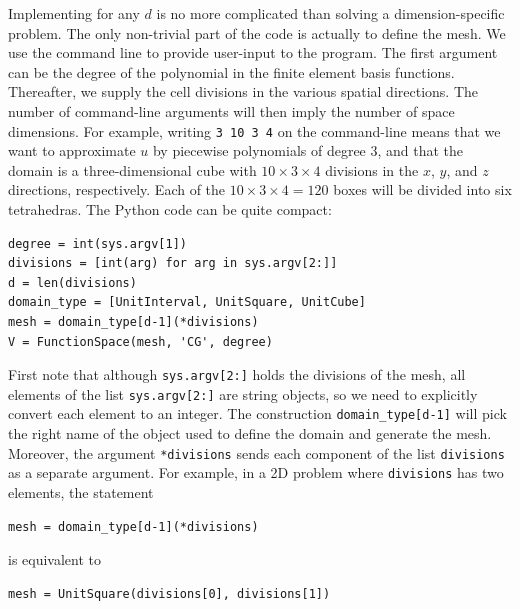 Implementing  for any $d$ is no more
complicated than solving a dimension-specific problem.
The only non-trivial part of the code is actually to define the mesh.
We use the command line to provide user-input to the program. The first argument
can be the degree of the polynomial in the finite element basis functions.
Thereafter, we supply the
cell divisions in the various spatial directions. The number of
command-line arguments will then imply the number of space dimensions.
For example, writing {\fontsize{12pt}{12pt}\texttt{3 10 3 4}} on the command-line means that
we want to approximate $u$ by piecewise polynomials of degree 3,
and that the domain is a three-dimensional cube with $10\times 3\times 4$
divisions in the $x$, $y$, and $z$ directions, respectively.
Each of the $10\times 3\times 4 = 120$ boxes will
be divided into six tetrahedras.
The Python code can be quite compact:
\begin{Verbatim}[fontsize=\fontsize{10pt}{10pt},tabsize=8,baselinestretch=1.05,
fontfamily=tt,xleftmargin=7mm]
degree = int(sys.argv[1])
divisions = [int(arg) for arg in sys.argv[2:]]
d = len(divisions)
domain_type = [UnitInterval, UnitSquare, UnitCube]
mesh = domain_type[d-1](*divisions)
V = FunctionSpace(mesh, 'CG', degree)
\end{Verbatim}
\noindent
First note that although {\fontsize{12pt}{12pt}\texttt{sys.argv[2:]}} holds the divisions of
the mesh, all elements of the list {\fontsize{12pt}{12pt}\texttt{sys.argv[2:]}} are string objects,
so we need to explicitly convert each element to an integer.
The construction {\fontsize{12pt}{12pt}\verb!domain_type[d-1]!} will pick the right name of the
object used to define the domain and generate the mesh.
Moreover, the argument {\fontsize{12pt}{12pt}\texttt{*divisions}}
sends each component of the list {\fontsize{12pt}{12pt}\texttt{divisions}} as a separate
argument. For example, in a 2D problem where {\fontsize{12pt}{12pt}\texttt{divisions}} has
two elements, the statement
\begin{Verbatim}[fontsize=\fontsize{10pt}{10pt},tabsize=8,baselinestretch=1.05,
fontfamily=tt,xleftmargin=7mm]
mesh = domain_type[d-1](*divisions)
\end{Verbatim}
\noindent
is equivalent to
\begin{Verbatim}[fontsize=\fontsize{10pt}{10pt},tabsize=8,baselinestretch=1.05,
fontfamily=tt,xleftmargin=7mm]
mesh = UnitSquare(divisions[0], divisions[1])
\end{Verbatim}
\noindent

